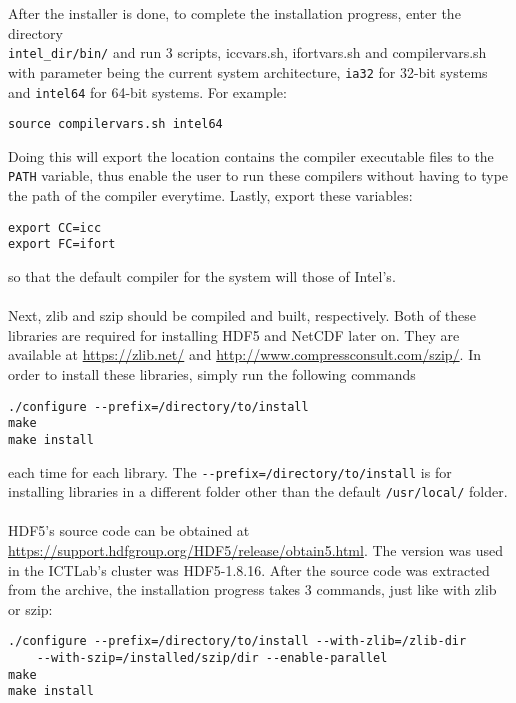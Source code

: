 After the installer is done, to complete the installation progress, enter the directory \\ \verb|intel_dir/bin/| and run 3 scripts, iccvars.sh, ifortvars.sh and compilervars.sh with parameter being the current system architecture, \verb|ia32| for 32-bit systems and \verb|intel64| for 64-bit systems. For example: 
\begin{center}
\begin{BVerbatim}
source compilervars.sh intel64
\end{BVerbatim}
\end{center}
Doing this will export the location contains the compiler executable files to the \verb|PATH| variable, thus enable the user to run these compilers without having to type the path of the compiler everytime. Lastly, export these variables: \\
\begin{center}
\begin{BVerbatim}
export CC=icc
export FC=ifort
\end{BVerbatim}
\end{center}
so that the default compiler for the system will those of Intel's. \\
~\\
Next, zlib and szip should be compiled and built, respectively. Both of these libraries are required for installing HDF5 and NetCDF later on. They are available at \url{https://zlib.net/} and \url{http://www.compressconsult.com/szip/}. In order to install these libraries, simply run the following commands
\begin{center}
\begin{BVerbatim}
./configure --prefix=/directory/to/install
make
make install
\end{BVerbatim}
\end{center}
each time for each library. The \verb|--prefix=/directory/to/install| is for installing libraries in a different folder other than the default \verb|/usr/local/| folder. \\
~\\
HDF5's source code can be obtained at \url{https://support.hdfgroup.org/HDF5/release/obtain5.html}. The version was used in the ICTLab's cluster was HDF5-1.8.16. After the source code was extracted from the archive, the installation progress takes 3 commands, just like with zlib or szip:
\begin{center}
\begin{BVerbatim}
./configure --prefix=/directory/to/install --with-zlib=/zlib-dir
	--with-szip=/installed/szip/dir --enable-parallel
make
make install
\end{BVerbatim}
\end{center}
